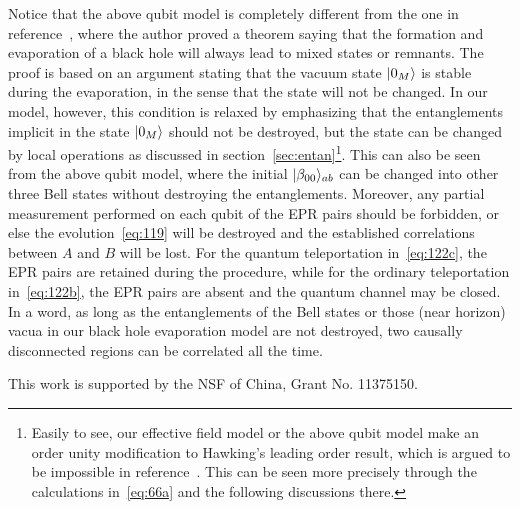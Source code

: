 \documentclass[12pt,a4paper]{article}
\begin{document}
Notice that the above qubit model is completely different
from the one in reference~\cite{p}, where the author proved a
theorem saying that the formation and evaporation of a black hole
will always lead to mixed states or remnants. The proof is based on an
argument stating that the vacuum state $\arrowvert 0_M\rangle$ is
stable during the evaporation, in the sense that the state will not be changed. In our model, however, this
condition is relaxed by emphasizing that the entanglements implicit in the state $\arrowvert 0_M\rangle$ should not be
destroyed, but the state can be changed by local operations as discussed in
section~\ref{sec:entan}\footnote{Easily to see, our effective field model or the above qubit model make an order unity modification to Hawking's leading order result, which is argued to be impossible in reference~\cite{p}. This can be seen more precisely through the calculations in~\eqref{eq:66a} and the following discussions there.}. This can also be seen from the above qubit model, where the initial $\arrowvert \beta_{00}\rangle_{ab}$ can be
changed into other three Bell states without destroying the
entanglements. Moreover, any partial measurement performed on each
qubit of the EPR pairs should be forbidden, or else the evolution~\eqref{eq:119} will be destroyed and the established correlations between $A$ and $B$ will be lost. For the quantum teleportation in~\eqref{eq:122c}, the EPR pairs are retained during the procedure, while for the ordinary teleportation in~\eqref{eq:122b}, the EPR pairs are absent and the quantum channel may be closed. In a word, as long as the entanglements of the Bell states or those (near horizon) vacua in our black hole evaporation model are not destroyed, two causally disconnected regions can be correlated all the time.




\acknowledgments

This work is supported by the NSF of China, Grant No. 11375150.
\end{document}
